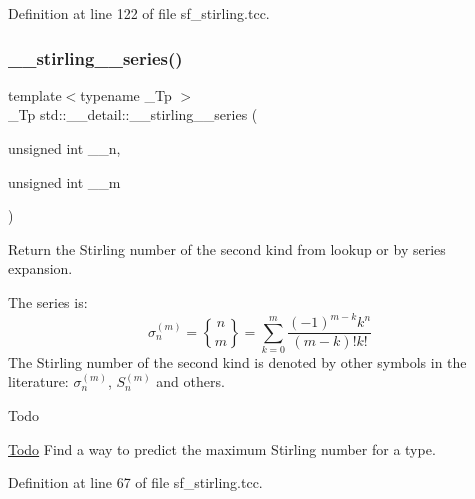 Definition at line 122 of file sf\+\_\+stirling.\+tcc.

\mbox{\label{namespacestd_1_1____detail_a8408f17699eb43a14447c7e4795b277f}} 
\subsubsection{\texorpdfstring{\+\_\+\+\_\+stirling\+\_\+\_\+series()}{\_\_stirling\_2\_series()}}
{\footnotesize\ttfamily template$<$typename \+\_\+\+Tp $>$ \\
\+\_\+\+Tp std\+::\+\_\+\+\_\+detail\+::\+\_\+\+\_\+stirling\+\_\+\_\+series (\begin{DoxyParamCaption}\item[{unsigned int}]{\+\_\+\+\_\+n,  }\item[{unsigned int}]{\+\_\+\+\_\+m }\end{DoxyParamCaption})}

Return the Stirling number of the second kind from lookup or by series expansion.

The series is\+: \[ \newcommand{\stirling}[2]{\genfrac{\{}{\}}{0pt}{0}{#1}{#2}} \sigma_n^{(m)} = \stirling{n}{m} = \sum_{k=0}^{m}\frac{(-1)^{m-k}k^n}{(m-k)!k!} \] The Stirling number of the second kind is denoted by other symbols in the literature\+: $ \sigma_n^{(m)} $, $ \textit{S}_n^{(m)} $ and others.

\begin{DoxyRefDesc}{Todo}
\item[\hyperlink{todo__todo000014}{Todo}]Find a way to predict the maximum Stirling number for a type. \end{DoxyRefDesc}


Definition at line 67 of file sf\+\_\+stirling.\+tcc.

\mbox{\label{namespacestd_1_1____detail_aadc19f2a38494343a752a8d4f924e3df}} 
